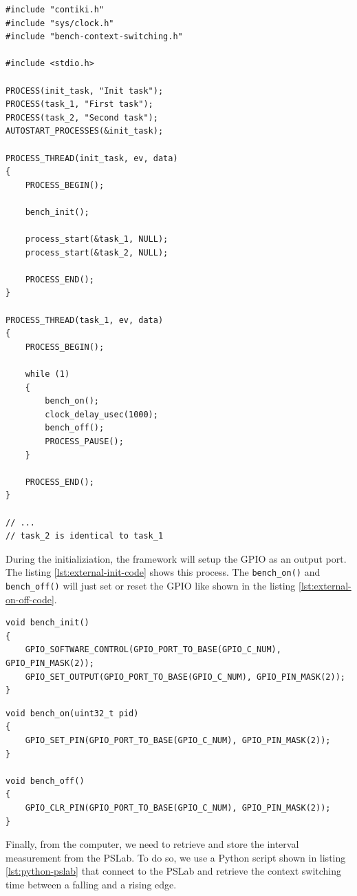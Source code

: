 \begin{lstlisting}[style=CStyle, float, caption={Source code of the simple application in Contiki}, label={lst:external-app-code}]
#include "contiki.h"
#include "sys/clock.h"
#include "bench-context-switching.h"

#include <stdio.h>

PROCESS(init_task, "Init task");
PROCESS(task_1, "First task");
PROCESS(task_2, "Second task");
AUTOSTART_PROCESSES(&init_task);

PROCESS_THREAD(init_task, ev, data)
{
    PROCESS_BEGIN();

    bench_init();

    process_start(&task_1, NULL);
    process_start(&task_2, NULL);

    PROCESS_END();
}

PROCESS_THREAD(task_1, ev, data)
{
    PROCESS_BEGIN();

    while (1)
    {
        bench_on();
        clock_delay_usec(1000);
        bench_off();
        PROCESS_PAUSE();
    }

    PROCESS_END();
}

// ...
// task_2 is identical to task_1
\end{lstlisting}

During the initializiation, the framework will setup the GPIO as an output port. The listing \ref{lst:external-init-code} shows this process.
The \texttt{bench\_on()} and \texttt{bench\_off()} will just set or reset the GPIO like shown in the listing \ref{lst:external-on-off-code}.

\begin{lstlisting}[style=CStyle, caption={Initializiation of the framework in Contiki}, label={lst:external-init-code}]
void bench_init()
{
    GPIO_SOFTWARE_CONTROL(GPIO_PORT_TO_BASE(GPIO_C_NUM), GPIO_PIN_MASK(2));
    GPIO_SET_OUTPUT(GPIO_PORT_TO_BASE(GPIO_C_NUM), GPIO_PIN_MASK(2));
}
\end{lstlisting}

\begin{lstlisting}[style=CStyle, caption={\texttt{bench\_on()} and \texttt{bench\_off()} implementation in Contiki}, label={lst:external-on-off-code}]
void bench_on(uint32_t pid)
{
    GPIO_SET_PIN(GPIO_PORT_TO_BASE(GPIO_C_NUM), GPIO_PIN_MASK(2));
}

void bench_off()
{
    GPIO_CLR_PIN(GPIO_PORT_TO_BASE(GPIO_C_NUM), GPIO_PIN_MASK(2));
}
\end{lstlisting}

Finally, from the computer, we need to retrieve and store the interval measurement from the PSLab.
To do so, we use a Python script shown in listing \ref{lst:python-pslab} that connect to the PSLab and retrieve the context switching time between a falling and a rising edge.

